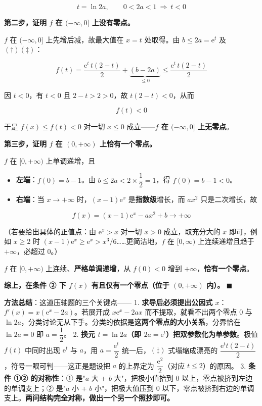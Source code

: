 \begin{answer}
\nopagebreak[4]
\[t=\ln2a,\qquad 0<2a<1\ \Longrightarrow\ t<0\]

\textbf{第二步，证明 $f$ 在 $(-\infty,0]$ 上没有零点。}

$f$ 在 $(-\infty,0]$ 上先增后减，故最大值在 $x=t$ 处取得。由 $b\le2a=\mathrm e^{t}$ 及 $(\dagger)(\ddagger)$：

\nopagebreak[4]
\[f(t)=\frac{\mathrm e^{t}\,t(2-t)}2+\underbrace{\left(b-2a\right)}_{\le0}\le\frac{\mathrm e^{t}\,t(2-t)}2\]

因 $t<0$，有 $t<0$ 且 $2-t>2>0$，故 $t(2-t)<0$，从而

\nopagebreak[4]
\[f(t)<0\]

于是 $f(x)\le f(t)<0$ 对一切 $x\le0$ 成立——\textbf{$f$ 在 $(-\infty,0]$ 上无零点}。

\textbf{第三步，证明 $f$ 在 $(0,+\infty)$ 上恰有一个零点。}

$f$ 在 $[0,+\infty)$ 上单调递增，且

\begin{itemize}
\item \textbf{左端}：$f(0)=b-1$。由 $b\le2a<2\times\dfrac12=1$，得 $f(0)=b-1<0$。
\item \textbf{右端}：当 $x\to+\infty$ 时，$(x-1)\mathrm e^{x}$ 是\textbf{指数级}增长，而 $ax^{2}$ 只是二次增长，故
\end{itemize}

\nopagebreak[4]
\[f(x)=(x-1)\mathrm e^{x}-ax^{2}+b\to+\infty\]

（若要给出具体的正值点：由 $\mathrm e^{x}>x$ 对一切 $x>0$ 成立，取充分大的 $x$ 即可，例如 $x\ge2$ 时 $(x-1)\mathrm e^{x}\ge\mathrm e^{x}>x^{3}/6$……更简洁地，$f$ 在 $[0,\infty)$ 上连续递增且趋于 $+\infty$，必超过 $0$。）

$f$ 在 $[0,+\infty)$ 上连续、\textbf{严格单调递增}，从 $f(0)<0$ 增到 $+\infty$，\textbf{恰有一个零点}。

\textbf{综上，在条件 ② 下 $f(x)$ 有且仅有一个零点（位于 $(0,+\infty)$ 内）。} $\blacksquare$

\begin{gktip}
\textbf{方法总结}：这道压轴题的三个关键点——
1. \textbf{求导后必须提出公因式 $x$}：$f'(x)=x\left(\mathrm e^{x}-2a\right)$。若展开成 $x\mathrm e^{x}-2ax$ 而不提取，就看不出两个零点 $0$ 与 $\ln2a$，分类讨论无从下手。分类的依据是\textbf{这两个零点的大小关系}，分界恰在 $\ln2a=0$ 即 $a=\dfrac12$。
2. \textbf{换元 $t=\ln2a$（即 $2a=\mathrm e^{t}$）把双参数化为单参数}。极值 $f(t)$ 中同时出现 $\mathrm e^{t}$ 与 $a$，用 $a=\dfrac{\mathrm e^{t}}2$ 统一后，$(\ddagger)$ 式塌缩成漂亮的 $\dfrac{\mathrm e^{t}t(2-t)}2$，符号一眼可判——这正是题设把 $a$ 的上界定为 $\dfrac{\mathrm e^{2}}2$（对应 $t\le2$）的原因。
3. \textbf{条件 ①② 的对称性}：① 是"$a$ 大 + $b$ 大"，把极小值抬到 $0$ 以上，零点被挤到左边的单调支上；② 是"$a$ 小 + $b$ 小"，把极大值压到 $0$ 以下，零点被挤到右边的单调支上。\textbf{两问结构完全对称，做出一个另一个照抄即可。}


\end{gktip}
\end{answer}
